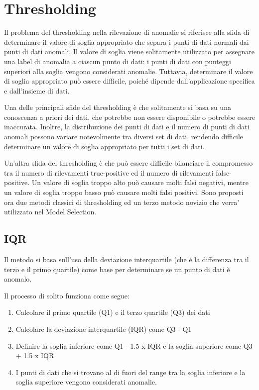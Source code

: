 \section{Thresholding}
Il problema del thresholding nella rilevazione di anomalie si riferisce alla sfida di determinare il valore di soglia appropriato che separa i punti di dati normali dai punti di dati anomali. Il valore di soglia viene solitamente utilizzato per assegnare una label di anomalia a ciascun punto di dati: i punti di dati con punteggi superiori alla soglia vengono considerati anomalie. Tuttavia, determinare il valore di soglia appropriato può essere difficile, poiché dipende dall'applicazione specifica e dall'insieme di dati.

Una delle principali sfide del thresholding è che solitamente si basa su una conoscenza a priori dei dati, che potrebbe non essere disponibile o potrebbe essere inaccurata. Inoltre, la distribuzione dei punti di dati e il numero di punti di dati anomali possono variare notevolmente tra diversi set di dati, rendendo difficile determinare un valore di soglia appropriato per tutti i set di dati.

Un'altra sfida del thresholding è che può essere difficile bilanciare il compromesso tra il numero di rilevamenti true-positive ed il numero di rilevamenti false-positive. Un valore di soglia troppo alto può causare molti falsi negativi, mentre un valore di soglia troppo basso può causare molti falsi positivi.
Sono proposti ora due metodi classici di thresholding ed un terzo metodo novizio che verra' utilizzato nel Model Selection.

\subsection{IQR}
Il metodo si basa sull'uso della deviazione interquartile (che è la differenza tra il terzo e il primo quartile) come base per determinare se un punto di dati è anomalo.

Il processo di solito funziona come segue:
\begin{enumerate}
\item Calcolare il primo quartile (Q1) e il terzo quartile (Q3) dei dati
\item Calcolare la deviazione interquartile (IQR) come Q3 - Q1
\item Definire la soglia inferiore come Q1 - 1.5 x IQR e la soglia superiore come Q3 + 1.5 x IQR
\item I punti di dati che si trovano al di fuori del range tra la soglia inferiore e la soglia superiore vengono considerati anomalie.
\end{enumerate}

